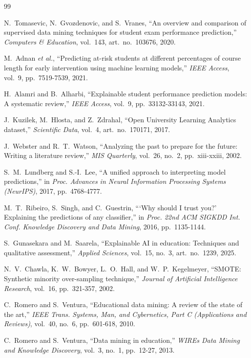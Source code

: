 \documentclass[conference]{IEEEtran}
\begin{document}
\begin{thebibliography}{99}

N.~Tomasevic, N.~Gvozdenovic, and S.~Vranes, ``An overview and comparison
of supervised data mining techniques for student exam performance
prediction,'' \emph{Computers \& Education}, vol.~143, art.~no.~103676,
2020.

M.~Adnan \emph{et al.}, ``Predicting at-risk students at different
percentages of course length for early intervention using machine learning
models,'' \emph{IEEE Access}, vol.~9, pp.~7519-7539, 2021.

H.~Alamri and B.~Alharbi, ``Explainable student performance prediction
models: A systematic review,'' \emph{IEEE Access}, vol.~9,
pp.~33132-33143, 2021.

J.~Kuzilek, M.~Hlosta, and Z.~Zdrahal, ``Open University Learning Analytics
dataset,'' \emph{Scientific Data}, vol.~4, art.~no.~170171, 2017.

J.~Webster and R.~T.~Watson, ``Analyzing the past to prepare for the
future: Writing a literature review,'' \emph{MIS Quarterly}, vol.~26,
no.~2, pp.~xiii-xxiii, 2002.

S.~M.~Lundberg and S.-I.~Lee, ``A unified approach to interpreting model
predictions,'' in \emph{Proc. Advances in Neural Information Processing
Systems (NeurIPS)}, 2017, pp.~4768-4777.

M.~T.~Ribeiro, S.~Singh, and C.~Guestrin, ```Why should I trust you?'
Explaining the predictions of any classifier,'' in \emph{Proc. 22nd ACM
SIGKDD Int. Conf. Knowledge Discovery and Data Mining}, 2016,
pp.~1135-1144.

S.~Gunasekara and M.~Saarela, ``Explainable AI in education: Techniques and
qualitative assessment,'' \emph{Applied Sciences}, vol.~15, no.~3,
art.~no.~1239, 2025.

N.~V.~Chawla, K.~W.~Bowyer, L.~O.~Hall, and W.~P.~Kegelmeyer, ``SMOTE:
Synthetic minority over-sampling technique,'' \emph{Journal of Artificial
Intelligence Research}, vol.~16, pp.~321-357, 2002.

C.~Romero and S.~Ventura, ``Educational data mining: A review of the state
of the art,'' \emph{IEEE Trans. Systems, Man, and Cybernetics, Part C
(Applications and Reviews)}, vol.~40, no.~6, pp.~601-618, 2010.

C.~Romero and S.~Ventura, ``Data mining in education,'' \emph{WIREs Data
Mining and Knowledge Discovery}, vol.~3, no.~1, pp.~12-27, 2013.


\end{thebibliography}
\end{document}
